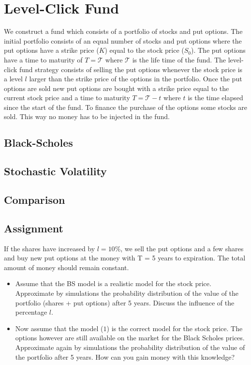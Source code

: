 \documentclass[11pt]{article}
\begin{document}
\section{Level-Click Fund}
We construct a fund which consists of a portfolio of stocks and put options.
The initial portfolio consists of an equal number of stocks and put options
where the put options have a strike price ($K$) equal to the stock price
($S_0$). The put options have a time to maturity of $T = \mathcal{T}$ where
$\mathcal{T}$ is the life time of the fund. The level-click fund strategy
consists of selling the put options whenever the stock price is a level $l$
larger than the strike price of the options in the portfolio. Once the put
options are sold new put options are bought with a strike price equal to the
current stock price and a time to maturity $T = \mathcal{T} - t$ where $t$ is
the time elapsed since the start of the fund. To finance the purchase of the
options some stocks are sold. This way no money has to be injected in the
fund.


\subsection{Black-Scholes}

\subsection{Stochastic Volatility}

\subsection{Comparison}


\subsection{Assignment}
If the shares have increased by $l = 10$\%, we sell the put options and a few
shares and buy new put options at the money with T = 5 years to expiration.
The total amount of money should remain constant.

\begin{itemize}
\item
Assume that the BS model is a realistic model for the stock price. Approximate
by simulations the probability distribution of the value of the portfolio
(shares + put options) after 5 years. Discuss the influence of the percentage
$l$.
\item
Now assume that the model ($1$) is the correct model for the stock price. The
options however are still available on the market for the Black Scholes
prices. Approximate again by simulations the probability distribution of the
value of the portfolio after 5 years. How can you gain money with this
knowledge?
\end{itemize}
\end{document}

